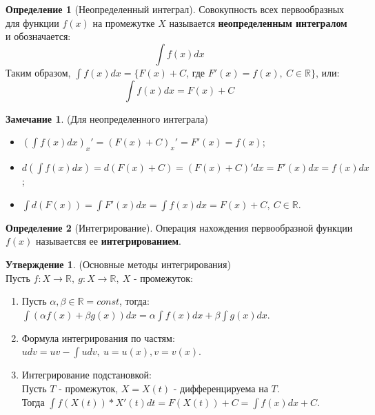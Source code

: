 \documentclass{report}
\theoremstyle{definition}
\newtheorem{definition}{Определение}[section]
\newtheorem{statement}{Утверждение}[section]
\newtheorem*{remark}{Замечание}
\begin{document}
\begin{definition}[Неопределенный интеграл]
  Совокупность всех первообразных для функции \(f(x)\) на промежутке \(X\) называется
  \textbf{неопределенным интегралом} и обозначается:
  \begin{equation*}
    \int f(x) dx
  \end{equation*}
  Таким образом, \(\int f(x) dx = \{F(x) + C\), где \(F'(x) = f(x), \ C \in \mathbb{R}\}\),
  или:
  \begin{equation*}
    \int f(x) dx = F(x) + C
  \end{equation*}
\end{definition}

\begin{remark}
  (Для неопределенного интеграла)
  \begin{itemize}
    \item \((\int f(x) dx)_{x}' = (F(x) + C)_{x}' = F'(x) = f(x)\);
    \item \(d(\int f(x) dx) = d(F(x) + C) = (F(x) + C)' dx = F'(x) dx = f(x) dx\);
    \item \(\int d(F(x)) = \int F'(x) dx = \int f(x) dx = F(x) + C, \ C \in \mathbb{R}\).
  \end{itemize}
\end{remark}

\begin{definition}[Интегрирование]
  Операция нахождения первообразной функции \(f(x)\) называетсвя ее \textbf{интегрированием}.
\end{definition}

\begin{statement}
  (Основные методы интегрирования) \\
  Пусть \(f: X \rightarrow \mathbb{R}, \ g:X \rightarrow \mathbb{R}, \ X\) - промежуток:
  \begin{enumerate}
    \item Пусть \(\alpha, \beta \in \mathbb{R} = const\), тогда:\\
          \(\int (\alpha f(x) + \beta g(x)) dx = \alpha \int f(x) dx + \beta \int g(x) dx\).
    \item Формула интегрирования по частям: \\
          \(udv = uv - \int udv, \ u = u(x), v = v(x)\).
    \item Интегрирование подстановкой: \\
          Пусть \(T\) - промежуток, \(X = X(t)\) - дифференцируема на \(T\). \\
          Тогда \(\int f(X(t)) * X'(t) dt = F(X(t)) + C = \int f(x) dx + C\).
  \end{enumerate}
\end{statement}
\end{document}
